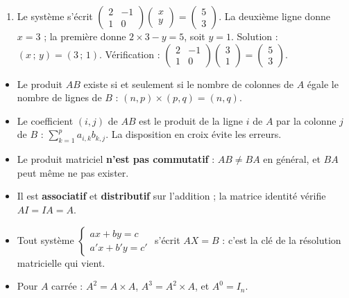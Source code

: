 \documentclass[11pt]{article}
\newcommand{\cle}[1]{{\popxbold\color{popdark}#1}}
\begin{document}
\begin{corrige}[Exercice 1]
\begin{enumerate}
\item Le système s'écrit $\begin{pmatrix} 2 & -1 \\ 1 & 0 \end{pmatrix}\begin{pmatrix} x \\ y \end{pmatrix} = \begin{pmatrix} 5 \\ 3 \end{pmatrix}$. La deuxième ligne donne $x = 3$ ; la première donne $2\times 3 - y = 5$, soit $y = 1$. Solution : $(x\,;\,y) = (3\,;\,1)$. Vérification : $\begin{pmatrix} 2 & -1 \\ 1 & 0 \end{pmatrix}\begin{pmatrix} 3 \\ 1 \end{pmatrix} = \begin{pmatrix} 5 \\ 3 \end{pmatrix}$. 
\end{enumerate}
\end{corrige}

\begin{aretenir}
\begin{itemize}
\item Le produit $AB$ existe si et seulement si le \cle{nombre de colonnes de $A$} égale le \cle{nombre de lignes de $B$} : $(n,p)\times(p,q) = (n,q)$.
\item Le coefficient $(i,j)$ de $AB$ est le produit de la ligne $i$ de $A$ par la colonne $j$ de $B$ : $\sum_{k=1}^{p} a_{i,k}b_{k,j}$. La disposition en croix évite les erreurs.
\item Le produit matriciel \textbf{n'est pas commutatif} : $AB \neq BA$ en général, et $BA$ peut même ne pas exister.
\item Il est \textbf{associatif} et \textbf{distributif} sur l'addition ; la matrice identité vérifie $AI = IA = A$.
\item Tout système $\begin{cases} ax+by=c \\ a'x+b'y=c' \end{cases}$ s'écrit $AX = B$ : c'est la clé de la résolution matricielle qui vient.
\item Pour $A$ carrée : $A^2 = A\times A$, $A^3 = A^2 \times A$, et $A^0 = I_n$.
\end{itemize}
\end{aretenir}
\end{document}
